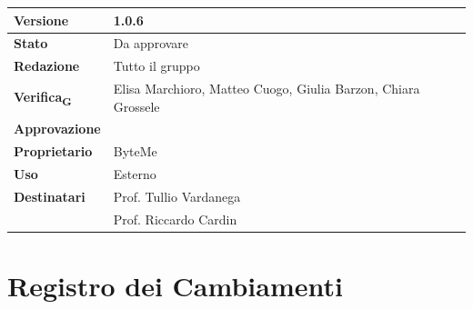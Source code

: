 \documentclass[11pt,a4paper]{article}
\newcommand{\gls}[1]{#1\textsubscript{G}}
\begin{document}
\begin{titlepage}
    \begin{table}[H]
        \centering
        \begin{tabular}{|l|p{5cm}|}
            \hline
            \textbf{Versione} & 1.0.6 \\
            \hline
            \textbf{Stato} & Da approvare\\
            \hline
            \textbf{Redazione} & Tutto il gruppo \\
            \hline
            \textbf{\gls{Verifica}} & Elisa Marchioro, Matteo Cuogo, Giulia Barzon, Chiara Grossele \\
            \hline
            \textbf{Approvazione} & \\
            \hline
            \textbf{Proprietario} & ByteMe \\
            \hline
            \textbf{Uso} & Esterno \\
            \hline
            \textbf{Destinatari} & Prof. Tullio Vardanega \\ & Prof. Riccardo Cardin \\
            \hline
        \end{tabular}
    \end{table}
    
    \vfill
\end{titlepage}

\thispagestyle{empty}
\section*{Registro dei Cambiamenti}
\end{document}
